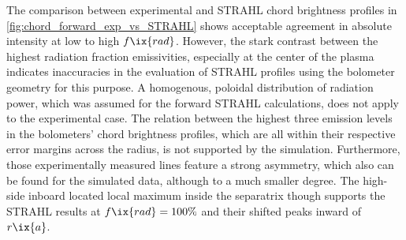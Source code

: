 %
            \begin{figure}[t]%
                \centering%
                \begin{minipage}[b]{0.48\textwidth}%
                    \centering%
                \end{minipage}%
                \hfill%
                \begin{minipage}[b]{0.48\textwidth}%
                    \centering%
                \end{minipage}%
                \label{fig:core_v_sol_comparisons}%
            \end{figure}%
%
            \newline%
            The comparison between experimental and STRAHL chord brightness profiles in \cref{fig:chord_forward_exp_vs_STRAHL} shows acceptable agreement in absolute intensity at low to high $f\ix{rad}$. However, the stark contrast between the highest radiation fraction emissivities, especially at the center of the plasma indicates inaccuracies in the evaluation of STRAHL profiles using the bolometer geometry for this purpose. A homogenous, poloidal distribution of radiation power, which was assumed for the forward STRAHL calculations, does not apply to the experimental case. The relation between the highest three emission levels in the bolometers' chord brightness profiles, which are all within their respective error margins across the radius, is not supported by the simulation. Furthermore, those experimentally measured lines feature a strong asymmetry, which also can be found for the simulated data, although to a much smaller degree. The high-side inboard located local maximum inside the separatrix though supports the STRAHL results at $f\ix{rad}=100\%$ and their shifted peaks inward of $r\ix{a}$.\\%
